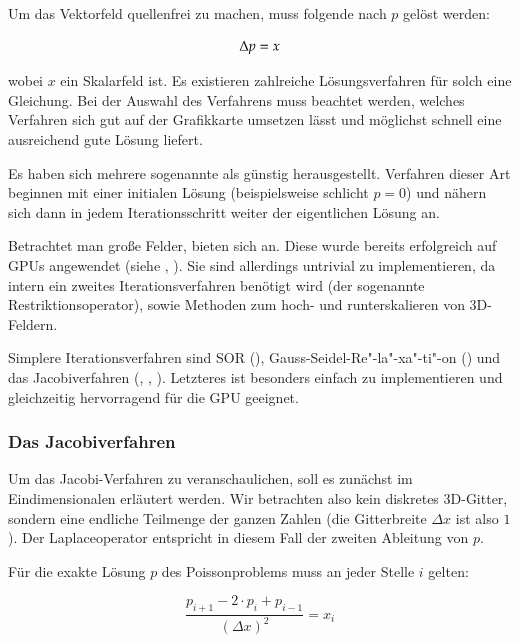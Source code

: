 Um das Vektorfeld quellenfrei zu machen, muss folgende
 nach $p$ gelöst werden:

\begin{equation}
\Delta{p} = x
\end{equation}

wobei $x$ ein Skalarfeld ist. Es existieren zahlreiche Lösungsverfahren für solch
eine Gleichung. Bei der Auswahl des Verfahrens muss beachtet werden, welches
Verfahren sich gut auf der Grafikkarte umsetzen lässt und möglichst schnell eine
ausreichend gute Lösung liefert.

Es haben sich mehrere sogenannte  als
günstig herausgestellt. Verfahren dieser Art beginnen mit einer initialen Lösung
(beispielsweise schlicht $p=0$) und nähern sich dann in jedem Iterationsschritt
weiter der eigentlichen Lösung an.

Betrachtet man große Felder, bieten sich 
an. Diese wurde bereits erfolgreich auf GPUs angewendet (siehe \cite{Bolz2002},
\cite{Matthias2006}). Sie sind allerdings untrivial zu implementieren, da intern
ein zweites Iterationsverfahren benötigt wird (der sogenannte
Restriktionsoperator), sowie Methoden zum hoch- und runterskalieren von
3D-Feldern.

Simplere Iterationsverfahren sind SOR (\cite{Saltvik2006}),
Gauss-Seidel-Re"-la"-xa"-ti"-on (\cite{Stam2003}) und das
Jacobiverfahren (\cite{Crane2007}, \cite{Harris2008},
\cite{Peschel2009}). Letzteres ist besonders einfach zu
implementieren und gleichzeitig hervorragend für die GPU geeignet.

\subsubsection{Das Jacobiverfahren}

Um das Jacobi-Verfahren zu veranschaulichen, soll es zunächst im
Eindimensionalen erläutert werden. Wir betrachten also kein diskretes 3D-Gitter,
sondern eine endliche Teilmenge der ganzen Zahlen (die Gitterbreite $\Delta x$
ist also $1$). Der Laplaceoperator entspricht in diesem Fall der zweiten
Ableitung von $p$.

Für die exakte Lösung $p$ des Poissonproblems muss an jeder Stelle $i$ gelten:

\begin{equation}
\label{eq:stam_jacobi_onedimensional}
\frac{
	p_{i+1} -
	2 \cdot p_{i} +
	p_{i-1}
}
{
	(\Delta x)^2
}
=
x_i
\end{equation}

